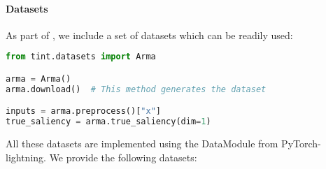 \paragraph{Datasets}

As part of \texttt{}, we include a set of datasets which can be readily used:

\begin{lstlisting}[language=Python, caption=Dataset loading example, label={lst:datasets}]
from tint.datasets import Arma

arma = Arma()
arma.download()  # This method generates the dataset

inputs = arma.preprocess()["x"]
true_saliency = arma.true_saliency(dim=1)
\end{lstlisting}

All these datasets are implemented using the DataModule from PyTorch-lightning.
We provide the following datasets:

